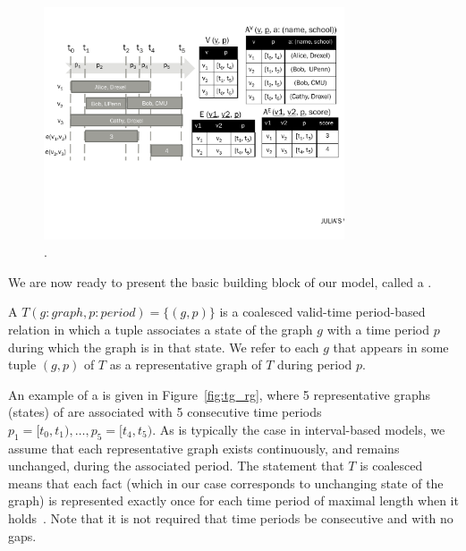 \begin{figure}
\centering
\includegraphics[width=3.5in]{figs/T1_rel_tab.pdf}
\caption{\tg {}.}
\label{fig:tg_ve}
\end{figure}



We are now ready to present the basic building block of our model,
called a \tg.  

\begin{definition}[TGraph]
A \tg $T(g:graph, p:period) = \{ (g,p) \}$ is a coalesced valid-time
period-based relation in which a tuple associates a state of the graph
$g$ with a time period $p$ during which the graph is in that state.
We refer to each $g$ that appears in some tuple $(g,p)$ of $T$ as a
representative graph of $T$ during period $p$.
\label{def:tg_abstract}
\end{definition}

An example of a \tg is given in Figure~\ref{fig:tg_rg}, where 5
representative graphs (states) of  are associated with 5
consecutive time periods $p_1=[t_0,t_1), \ldots, p_5=[t_4,t_5)$.  As
    is typically the case in interval-based models, we assume that
    each representative graph exists continuously, and remains
    unchanged, during the associated period.  The statement that $T$
    is coalesced means that each fact (which in our case corresponds
    to unchanging state of the graph) is represented exactly once for
    each time period of maximal length when it
    holds~\cite{DBLP:conf/vldb/BohlenSS96}.  Note that it is not
    required that time periods be consecutive and with no gaps.

